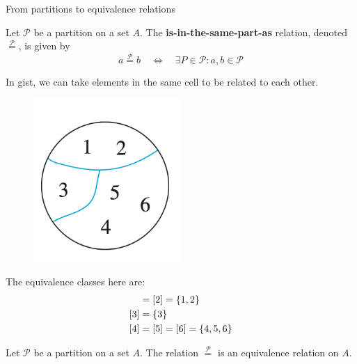 \documentclass[10pt]{beamer}
\begin{document}
\begin{frame}{From partitions to equivalence relations}
\footnotesize 
 \begin{mygreenbox}[title=Definition]  
Let $\mathcal{P}$ be a partition on a set $A$. The \textbf{is-in-the-same-part-as} relation, denoted  $\stackrel{\mathcal{P}}{=}$, is given by
\[ a \stackrel{\mathcal{P}}{=} b \quad  \iff \quad \exists P \in \mathcal{P} : a,b \in \mathcal{P} \]
\end{mygreenbox}
\vfill 
\begin{myyellowbox}[title=Remark]
In gist, we can take elements in the same cell to be related to each other. 
\end{myyellowbox}
\vfill 
\begin{myredbox}[title=Example]

\begin{minipage}{0.3\textwidth}

\begin{figure}
\includegraphics[width=0.5\textwidth]{images/partition.png}	
\end{figure}
\end{minipage}
\hfill 
\begin{minipage}{0.6\textwidth}
The equivalence classes here are:
\begin{align*}
[1] &=  [2] = \set{1,2} \\
[3] &= \set{3} \\
[4] &= [5] = [6] = \set{4,5,6} 
\end{align*}
\end{minipage}
\end{myredbox}

\vfill 
 \begin{mygreenbox}[title=\text{Proposition (Scheinerman Prop 16.3)}]  
Let $\mathcal{P}$ be a partition on a set $A$. The relation $\stackrel{\mathcal{P}}{=}$ is an equivalence relation on $A$.
\end{mygreenbox}


\end{frame}
\end{document}
